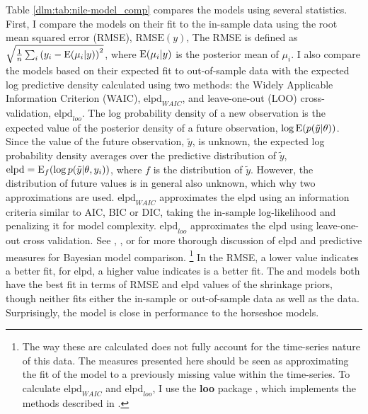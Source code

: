 Table \ref{dlm:tab:nile-model_comp} compares the models using several statistics.
First, I compare the models on their fit to the in-sample data using the root mean squared error (RMSE), $\mathrm{RMSE}(y)$, 
The RMSE is defined as $\sqrt{\frac{1}{n} \sum_{i} {(y_{i} - \operatorname{E}(\mu_{i} | y))}^{2}}$, where $\operatorname{E}(\mu_{i} | y)$ is the posterior mean of $\mu_{i}$.
I also compare the models based on their expected fit to out-of-sample data with the expected log predictive density calculated using two methods: the Widely Applicable Information Criterion (WAIC), $\mathrm{elpd}_{WAIC}$, and leave-one-out (LOO) cross-validation, $\mathrm{elpd}_{loo}$.
The log probability density of a new observation is the expected value of the posterior density of a future observation, $\log \operatorname{E}(p(\tilde{y} | \theta))$.
Since the value of the future observation, $\tilde{y}$, is unknown, the expected log probability density averages over the predictive distribution of $\tilde{y}$, $\mathrm{elpd} = \operatorname{E}_{f}(\log p(\tilde{y} | \theta, y_{i}))$, where $f$ is the distribution of $\tilde{y}$. 
However, the distribution of future values is in general also unknown, which why two approximations are used.
$\mathrm{elpd}_{WAIC}$ approximates the $\mathrm{elpd}$ using an information criteria similar to AIC, BIC or DIC, taking the in-sample log-likelihood and penalizing it for model complexity.
$\mathrm{elpd}_{loo}$ approximates the $\mathrm{elpd}$ using leave-one-out cross validation.
See \textcite{GelmanCarlinSternEtAl2013a}, \textcites{GelmanVehtari2014a}, or \textcites{GelmanHwangVehtari2014a} for more thorough discussion of elpd and predictive measures for Bayesian model comparison.%
\footnote{
  The way these are calculated does not fully account for the time-series nature of this data.
  The measures presented here should be seen as approximating the fit of the model to a previously missing value within the time-series.
  To calculate $\mathrm{elpd}_{WAIC}$ and $\mathrm{elpd}_{loo}$, I use the \textbf{loo} \RLang{} package \parencite{VehtariGelmanGabry2015a}, which implements the methods described in \textcite{GelmanVehtari2014a}.
}
In the RMSE, a lower value indicates a better fit, for $\mathrm{elpd}$, a higher value indicates is a better fit.
The  and  models both have the best fit in terms of RMSE and $\mathrm{elpd}$ values of the shrinkage priors, though neither fits either the in-sample or out-of-sample data as well as the  data.
Surprisingly, the  model is close in performance to the horseshoe models.

